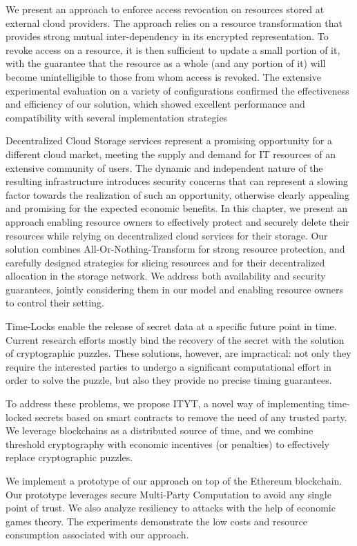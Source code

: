 We present an approach to enforce access revocation on resources stored at external cloud providers. The approach relies on a resource transformation that provides strong mutual inter-dependency in its encrypted representation. To revoke access on a resource, it is then sufficient to update a small portion of it, with the guarantee that the resource as a whole (and any portion of it) will become unintelligible to those from whom access is revoked. The extensive experimental evaluation on a variety of configurations confirmed the effectiveness and efficiency of our solution, which showed excellent performance and compatibility with several implementation strategies


Decentralized Cloud Storage services represent a promising opportunity
for a different cloud market, meeting the supply and demand for IT
resources of an extensive community of users.  The dynamic and
independent nature of the resulting infrastructure introduces security
concerns that can represent a slowing factor towards the realization
of such an opportunity, otherwise clearly appealing and promising for
the expected economic benefits.  In this chapter, we present an approach
enabling resource owners to effectively protect and securely delete
their resources while relying on decentralized cloud services for
their storage. Our solution combines All-Or-Nothing-Transform for
strong resource protection, and carefully designed strategies for
slicing resources and for their decentralized allocation in the
storage network.  We address both availability and security
guarantees, jointly considering them in our model and enabling
resource owners to control their setting.


Time-Locks enable the release of secret data at a specific future point in time.
Current research efforts mostly bind the recovery of the secret with the solution of cryptographic puzzles.
These solutions, however, are  impractical: 
not only they require the interested parties to undergo a significant computational effort in order to solve the puzzle, but also they provide no precise timing guarantees.

To address these problems, we propose ITYT, a novel way of implementing time-locked secrets based on smart contracts to remove the need of any trusted party.
We leverage blockchains as a distributed source of time, and we combine threshold cryptography with economic incentives (or penalties) to effectively replace cryptographic puzzles.


We implement a prototype of our approach on top of the Ethereum blockchain. Our prototype leverages secure Multi-Party Computation to avoid any single point of trust.
We also analyze resiliency to attacks with the help of economic games theory.
The experiments demonstrate the low costs and resource consumption associated with our approach.  



